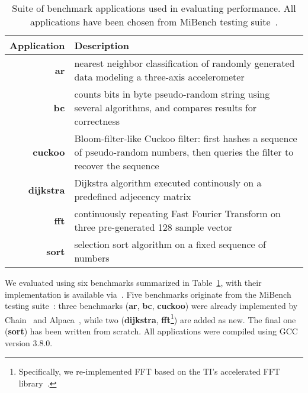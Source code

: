\begin{table}
	\centering
	\footnotesize
	\begin{tabular}{| r | p{} |}
		\hline
		Application & Description \\
		\hline\hline
		\textbf{ar} & nearest neighbor classification of randomly generated data modeling a three-axis accelerometer\\
		\hline
		\textbf{bc} & counts bits in byte pseudo-random string using several algorithms, and compares results for correctness\\
		\hline
		\textbf{cuckoo} & Bloom-filter-like Cuckoo filter: first hashes a sequence of pseudo-random numbers, then queries the filter to recover the sequence\\
		\hline
		\textbf{dijkstra} &  Dijkstra algorithm executed continously on a predefined adjecency matrix\\
		\hline
		\textbf{fft} & continuously repeating Fast Fourier Transform on three pre-generated 128 sample vector\\
		\hline
		\textbf{sort} & selection sort algorithm on a fixed sequence of numbers\\
		\hline
	\end{tabular}
\caption{Suite of benchmark applications used in evaluating \sys performance. All applications have been chosen from MiBench testing suite~\cite{mibench,hicks_mibench2_2016}.}
\label{table:benchmark_table}
\end{table}

We evaluated \sys using six benchmarks summarized in Table~\ref{table:benchmark_table}, with their implementation is available via~\cite{coala_website}. Five benchmarks originate from the MiBench testing suite~\cite{mibench,hicks_mibench2_2016}: three benchmarks (\textbf{ar}, \textbf{bc}, \textbf{cuckoo}) were already implemented by Chain~\cite{chain} and Alpaca~\cite{alpaca}, while two (\textbf{dijkstra}, \textbf{fft}\footnote{Specifically, we re-implemented FFT based on the TI's accelerated FFT library~\cite{}.}) are added as new. The final one (\textbf{sort}) has been written from scratch.  All applications were compiled using GCC version 3.8.0.  

